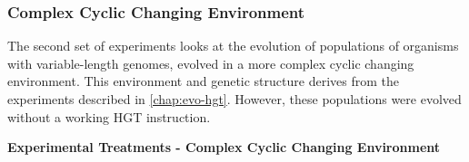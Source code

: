 \documentclass[PhD]{msu-thesis}
\begin{document}
\subsubsection{Complex Cyclic Changing Environment}
The second set of experiments looks at the evolution of populations of organisms with variable-length genomes, evolved in a more complex cyclic changing environment. This environment and genetic structure derives from the experiments described in \ref{chap:evo-hgt}. However, these populations were evolved without a working HGT instruction.

	\begin{table}[]
	\centering
	\caption{\textbf{Experimental Treatments - Complex Cyclic Changing Environment}}
	\label{cel-treatments-h}


\end{table}
\end{document}
